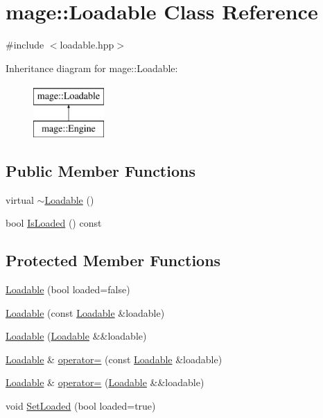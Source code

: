 \hypertarget{classmage_1_1_loadable}{}\section{mage\+:\+:Loadable Class Reference}
\label{classmage_1_1_loadable}


{\ttfamily \#include $<$loadable.\+hpp$>$}

Inheritance diagram for mage\+:\+:Loadable\+:\begin{figure}[H]
\begin{center}
\leavevmode
\includegraphics[height=2.000000cm]{classmage_1_1_loadable}
\end{center}
\end{figure}
\subsection*{Public Member Functions}
\begin{DoxyCompactItemize}
\item 
virtual \hyperlink{classmage_1_1_loadable_a8088935f7536c0c77ddb34a29ece63b1}{$\sim$\+Loadable} ()
\item 
bool \hyperlink{classmage_1_1_loadable_a53cfa5beb9b44bbcda0d6166a54b8cb6}{Is\+Loaded} () const
\end{DoxyCompactItemize}
\subsection*{Protected Member Functions}
\begin{DoxyCompactItemize}
\item 
\hyperlink{classmage_1_1_loadable_afbdcb287b5e20583899a27a1c244bc7d}{Loadable} (bool loaded=false)
\item 
\hyperlink{classmage_1_1_loadable_aaea04657cc6f150659f0ab387f6a5514}{Loadable} (const \hyperlink{classmage_1_1_loadable}{Loadable} \&loadable)
\item 
\hyperlink{classmage_1_1_loadable_aad6ac6495924e0787c377d665a076f2a}{Loadable} (\hyperlink{classmage_1_1_loadable}{Loadable} \&\&loadable)
\item 
\hyperlink{classmage_1_1_loadable}{Loadable} \& \hyperlink{classmage_1_1_loadable_a4a082e96811229b3869c03f964b5742d}{operator=} (const \hyperlink{classmage_1_1_loadable}{Loadable} \&loadable)
\item 
\hyperlink{classmage_1_1_loadable}{Loadable} \& \hyperlink{classmage_1_1_loadable_a3853fa7d95ef2b5c8d27ff9884b73633}{operator=} (\hyperlink{classmage_1_1_loadable}{Loadable} \&\&loadable)
\item 
void \hyperlink{classmage_1_1_loadable_a932ff8b287c8e68e30a13804cba08ff2}{Set\+Loaded} (bool loaded=true)
\end{DoxyCompactItemize}
